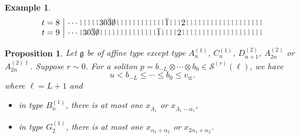 \documentclass[reqno]{amsart}
\newcommand{\g}{\mathfrak{g}}
\newcommand{\clfw}{\overline{\Lambda}} %
\newcommand{\Sol}{\mathcal{S}} %
\theoremstyle{plain}
\newtheorem{prop}[thm]{Proposition}
\theoremstyle{definition}
\newtheorem{ex}[thm]{Example}
\numberwithin{equation}{section}
\begin{document}
\begin{ex}
\[{\begin{array}{c|c}
t = 8 & \cdots {\color{gray} 1} {\color{gray} 1} {\color{gray} 1} {\color{gray} 1} {\color{gray} 1} 3 0 \overline{3} \emptyset {\color{gray} 1} {\color{gray} 1} {\color{gray} 1} {\color{gray} 1} {\color{gray} 1} {\color{gray} 1} {\color{gray} 1} {\color{gray} 1} {\color{gray} 1} {\color{gray} 1} {\color{gray} 1} {\color{gray} 1} \overline{1} {\color{gray} 1} {\color{gray} 1} {\color{gray} 1} 2 {\color{gray} 1} {\color{gray} 1} {\color{gray} 1} {\color{gray} 1} {\color{gray} 1} {\color{gray} 1} {\color{gray} 1} {\color{gray} 1} {\color{gray} 1} {\color{gray} 1} {\color{gray} 1} {\color{gray} 1} {\color{gray} 1} {\color{gray} 1} {\color{gray} 1} {\color{gray} 1} {\color{gray} 1} {\color{gray} 1} {\color{gray} 1} \\
t = 9 & \cdots {\color{gray} 1} 3 0 \overline{3} \emptyset {\color{gray} 1} {\color{gray} 1} {\color{gray} 1} {\color{gray} 1} {\color{gray} 1} {\color{gray} 1} {\color{gray} 1} {\color{gray} 1} {\color{gray} 1} {\color{gray} 1} {\color{gray} 1} {\color{gray} 1} {\color{gray} 1} {\color{gray} 1} \overline{1} {\color{gray} 1} {\color{gray} 1} {\color{gray} 1} {\color{gray} 1} 2 {\color{gray} 1} {\color{gray} 1} {\color{gray} 1} {\color{gray} 1} {\color{gray} 1} {\color{gray} 1} {\color{gray} 1} {\color{gray} 1} {\color{gray} 1} {\color{gray} 1} {\color{gray} 1} {\color{gray} 1} {\color{gray} 1} {\color{gray} 1} {\color{gray} 1} {\color{gray} 1} {\color{gray} 1} {\color{gray} 1} {\color{gray} 1} {\color{gray} 1} \\
\end{array}}
\]
\end{ex}

\begin{prop}
\label{prop:soliton_adjoint}
Let $\g$ be of affine type except type $A_n^{(1)}$, $C_n^{(1)}$, $D_{n+1}^{(2)}$, $A_{2n}^{(2)}$ or $A_{2n}^{(2)\dagger}$.
Suppose $r \sim 0$.
For a soliton $p = b_{-L} \otimes \cdots \otimes b_0 \in \Sol^{(r)}(\ell)$, we have
\[
u < b_{-L} \leq \cdots \leq b_0 \leq v_{\varpi}.
\]
where $\ell = L + 1$ and
\begin{itemize}
\item in type $B_n^{(1)}$, there is at most one $x_{\clfw_1}$ or $x_{\clfw_1 - \alpha_1}$,
\item in type $G_2^{(1)}$, there is at most one $x_{\alpha_1+\alpha_2}$ or $x_{2\alpha_1+\alpha_2}$.
\end{itemize}
\end{prop}
\end{document}
